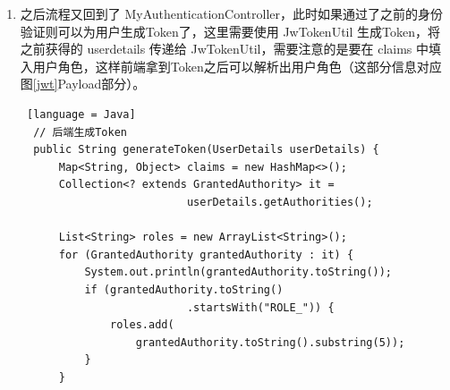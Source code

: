 \begin{enumerate}
\begin{enumerate}
\begin{lstlisting} [language = Java]
    public boolean supports(Class<?> authentication) {
        return XXXUsernamePasswordAutenticationToken
                .class
                .isAssignableFrom(authentication);
    }
              \end{lstlisting}
                DaoAuthenticationProvider 是继承 AbstractUserDetailsAuthenticationProvider 的，不同在于 DaoAuthenticationProvider 增加了验证密码的功能，这也正是我们需要的，但是验证密码需要查询数据库也就需要 UserDetailService，所以需要通过 MySecurityConfig 为 XXXAuthProvider 注入不同的 XXXUserDetialsService。这里选择setter注入：
                \begin{lstlisting} [language = Java]
  // XXXDaoAuthProvider
  @Override
  public void setUserDetailsService(
      UserDetailsService userDetailsService) {
      super.setUserDetailsService(userDetailsService);
  }
              \end{lstlisting}
                \begin{lstlisting} [language = Java]
  // MySecurityConfig
  @Autowired
  @Qualifier("XXXUserDetailsService")
  private UserDetailsService XXXUserDetailsService;

  // 注入
  @Bean("XXXDaoAutenticationProvider")
  DaoAuthenticationProvider daoXXXDaoAutenticationProvider() 
  {
    return new XXXDaoAutenticationProvider(
                                passwordEncoder(), 
                                XXXUserDetailsService);
  }
              \end{lstlisting}
                这个过程中涉及的类比较多且关系比较笔复杂，可以参考图\ref{SpringSecurityMultiUser}（经过简化，略去了与该流程相关程度不大的类）。
          \item 之后流程又回到了 MyAuthenticationController，此时如果通过了之前的身份验证则可以为用户生成Token了，这里需要使用 JwTokenUtil 生成Token，将 之前获得的 userdetails 传递给 JwTokenUtil，需要注意的是要在 claims 中填入用户角色，这样前端拿到Token之后可以解析出用户角色（这部分信息对应图\ref{jwt}Payload部分）。
                \begin{lstlisting} [language = Java]
  // 后端生成Token
  public String generateToken(UserDetails userDetails) {
      Map<String, Object> claims = new HashMap<>();
      Collection<? extends GrantedAuthority> it = 
                          userDetails.getAuthorities();

      List<String> roles = new ArrayList<String>();
      for (GrantedAuthority grantedAuthority : it) {
          System.out.println(grantedAuthority.toString());
          if (grantedAuthority.toString()
                          .startsWith("ROLE_")) {
              roles.add(
                  grantedAuthority.toString().substring(5));
          }
      }
      

\end{lstlisting}
\end{enumerate}
\end{enumerate}
